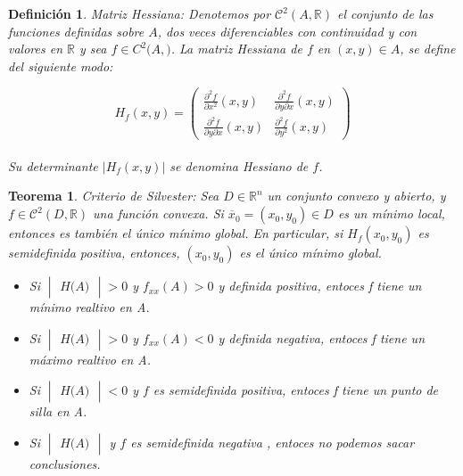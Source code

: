 \documentclass[a4paper,10pt]{article}
\newtheorem{theorem}{Teorema}
\newtheorem{definition}{Definición}
\begin{document}
\begin{definition}
Matriz Hessiana:  Denotemos por $\mathcal{C^2}(A,\mathbb{R})$  el conjunto de las funciones definidas
sobre $A$, dos veces diferenciables con continuidad y con valores en $\mathbb{R}$ y sea $f \in
C^2(A, \mathbb)$. La matriz Hessiana de $f$ en $(x, y) \in A$, se define del siguiente modo:

$$
H_f(x,y)=\left(
\begin{array}{cc}
\frac{\partial^2f}{\partial x^2}(x,y) & \frac{\partial^2f}{\partial y\partial x}(x,y) \\
\frac{\partial^2f}{\partial y\partial x}(x,y) & \frac{\partial^2f}{\partial y^2}(x,y)
\end{array}
\right)
$$
\\
Su determinante $|H_f(x,y)|$ se denomina Hessiano de $f$.
\end{definition}
\begin{theorem}
Criterio de Silvester: Sea $D\in\mathbb{R}^n$ un conjunto convexo y abierto, y $f\in\mathcal{C}^2(D,\mathbb{R})$ una función convexa. Si $\overline{x}_0=(x_0,y_0)\in D$ es un mínimo local, entonces es también el único mínimo global. En particular, si $H_f(x_0,y_0)$ es semidefinida positiva, entonces, $(x_0,y_0)$ es el único mínimo global.
\begin{itemize}
    \item Si $\begin{vmatrix}\textit{H(A)}\end{vmatrix}>0$ y $ f_{xx}(A)>0$ y definida positiva, entoces \textit{f} tiene un mínimo realtivo en \textit{A}.
    \item Si $\begin{vmatrix}\textit{H(A)}\end{vmatrix}>0$ y $ f_{xx}(A)<0$ y definida negativa, entoces \textit{f} tiene un máximo realtivo en \textit{A}.
    \item Si $\begin{vmatrix}\textit{H(A)}\end{vmatrix}<0$ y $f$ es semidefinida positiva, entoces \textit{f} tiene un punto de silla en \textit{A}.
    \item Si $\begin{vmatrix}\textit{H(A)}\end{vmatrix}$ y $f$ es semidefinida negativa , entoces no podemos sacar conclusiones.
\end{itemize}

\end{theorem}
\end{document}
